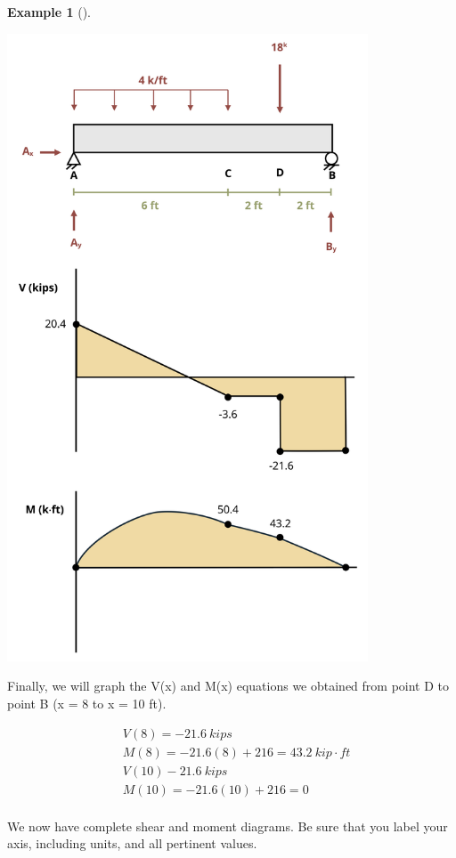 \documentclass[
  letterpaper,
  DIV=11,
  numbers=noendperiod]{scrreprt}
\theoremstyle{definition}
\newtheorem{example}{Example}[chapter]
\theoremstyle{remark}
\begin{document}
\begin{tcolorbox}
\begin{example}[]
\begin{tcolorbox}
\begin{center}
\includegraphics[width=4.21875in,height=\textheight]{images/CH7 PNGs/example 7.2 part 9.png}
\end{center}

Finally, we will graph the V(x) and M(x) equations we obtained from
point D to point B (x = 8 to x = 10 ft).

\[
\begin{aligned}
&V(8)=-21.6{~kips} \\
&M(8)=-21.6(8)+216=43.2{~kip}\cdot{ft} \\
&V(10)-21.6{~kips} \\
&M(10)=-21.6(10)+216=0 \\
\end{aligned}
\]

We now have complete shear and moment diagrams. Be sure that you label
your axis, including units, and all pertinent values.


\end{tcolorbox}
\end{example}
\end{tcolorbox}
\end{document}
